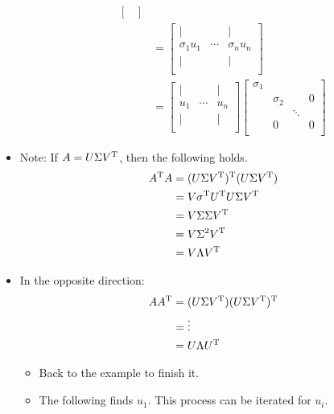 \documentclass{article}
\begin{document}
\begin{itemize}
\begin{itemize}
\begin{align*}
\begin{bmatrix}
            \end{bmatrix}\\
            &=
            \begin{bmatrix}
                | &  & |\\
                \sigma_1u_1 & \cdots & \sigma_nu_n\\
                | &  & |\\
            \end{bmatrix}\\
            &=
            \begin{bmatrix}
                | &  & |\\
                u_1 & \cdots & u_n\\
                | &  & |\\
            \end{bmatrix}
            \begin{bmatrix}
                \sigma_1 & & &\\
                 & \sigma_2 & & 0\\
                 & & \ddots &\\
                 & 0 & & 0\\
            \end{bmatrix}
        \end{align*}
    \end{itemize}
    \item Note: If $A=U\Sigma V^{\text{T}}$, then the following holds.
    \begin{align*}
        A^{\text{T}} A &= (U\Sigma V^{\text{T}})^{\text{T}}(U\Sigma V^{\text{T}})\\
        &= V\sigma^{\text{T}} U^{\text{T}} U\Sigma V^{\text{T}}\\
        &= V\Sigma\Sigma V^{\text{T}}\\
        &= V\Sigma^2V^{\text{T}}\\
        &= V\Lambda V^{\text{T}}
    \end{align*}
    \item In the opposite direction:
    \begin{align*}
        AA^{\text{T}} &= (U\Sigma V^{\text{T}})(U\Sigma V^{\text{T}})^{\text{T}}\\
        &= \vdots\\
        &= U\Lambda U^{\text{T}}
    \end{align*}
    \begin{itemize}
        \item Back to the example to finish it.
        \item The following finds $u_1$. This process can be iterated for $u_i$.

\end{itemize}
\end{itemize}
\end{document}
